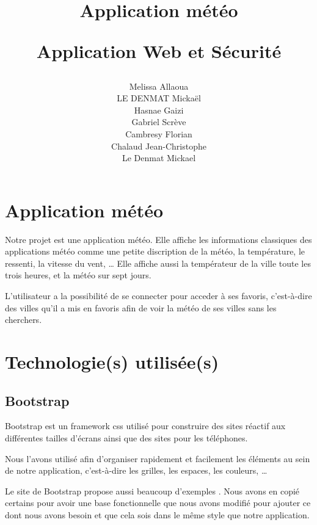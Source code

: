 \documentclass[a4paper, 12pt, french]{article}
\title{
	\Huge
	\textbf{Application météo}
	\vspace{0.4cm}

	\LARGE
	Application Web et Sécurité
}
\author{
	Melissa Allaoua \\
        LE DENMAT Mickaël \\
        Hasnae Gaizi \\
        Gabriel Scrève \\Cambresy Florian \\
	Chalaud Jean-Christophe \\
	Le Denmat Mickael
}
\begin{document}
	

	\newpage
	\renewcommand{\contentsname}{Table des matières}
	\tableofcontents

	\newpage
	\section{Application météo}
		Notre projet est une application météo. Elle affiche les
		informations classiques des applications météo comme
		une petite discription de la météo, la température,
		le ressenti, la vitesse du vent, \ldots
		Elle affiche aussi la températeur de la ville toute les trois heures,
		et la météo sur sept jours.
		

		L'utilisateur a la possibilité de se connecter pour acceder à ses
		favoris, c'est-à-dire des villes qu'il a mis en favoris afin de
		voir la météo de ses villes sans les cherchers.

	\section{Technologie(s) utilisée(s)}
		\subsection{Bootstrap}
			Bootstrap est un framework css \cite*{Bootstrap} utilisé pour construire des sites
			réactif aux différentes tailles d'écrans ainsi que des sites pour les
			téléphones.

			Nous l'avons utilisé afin d'organiser rapidement et facilement
			les éléments au sein de notre application, c'est-à-dire les grilles,
			les espaces, les couleurs, \ldots

			Le site de Bootstrap propose aussi beaucoup d'exemples 
			\cite*{Bootstrap-Exemples}. Nous avons en copié certains
			pour avoir une base fonctionnelle que nous avons modifié pour
			ajouter ce dont nous avons besoin et que cela sois dans le même
			style que notre application.
\end{document}
